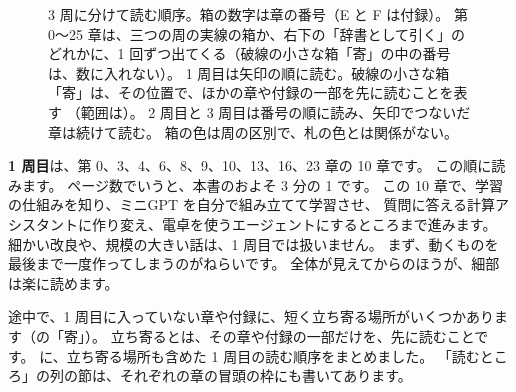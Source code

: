 \begin{figure}[tbp]
\caption{3 周に分けて読む順序。箱の数字は章の番号（E と F は付録）。
第 0〜25 章は、三つの周の実線の箱か、右下の「辞書として引く」のどれかに、1 回ずつ出てくる（破線の小さな箱「寄」の中の番号は、数に入れない）。
1 周目は矢印の順に読む。破線の小さな箱「寄」は、その位置で、ほかの章や付録の一部を先に読むことを表す
（範囲は）。
2 周目と 3 周目は番号の順に読み、矢印でつないだ章は続けて読む。
箱の色は周の区別で、札の色とは関係がない。}
\label{fig:intro-route}
\end{figure}

\textbf{1 周目}は、第 0、3、4、6、8、9、10、13、16、23 章の 10 章です。
この順に読みます。
ページ数でいうと、本書のおよそ 3 分の 1 です。
この 10 章で、学習の仕組みを知り、ミニGPT を自分で組み立てて学習させ、
質問に答える計算アシスタントに作り変え、電卓を使うエージェントにするところまで進みます。
細かい改良や、規模の大きい話は、1 周目では扱いません。
まず、動くものを最後まで一度作ってしまうのがねらいです。
全体が見えてからのほうが、細部は楽に読めます。

途中で、1 周目に入っていない章や付録に、短く立ち寄る場所がいくつかあります（の「寄」）。
立ち寄るとは、その章や付録の一部だけを、先に読むことです。
に、立ち寄る場所も含めた 1 周目の読む順序をまとめました。
「読むところ」の列の節は、それぞれの章の冒頭の枠にも書いてあります。

